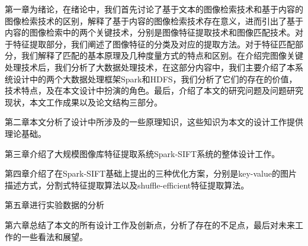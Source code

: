 第一章为绪论，在绪论中，我们首先讨论了基于文本的图像检索技术和基于内容的图像检索技术的区别，解释了基于内容的图像检索技术存在意义，进而引出了基于内容的图像检索中的两个关键技术，分别是图像特征提取技术和图像匹配技术。对于特征提取部分，我们阐述了图像特征的分类及对应的提取方法。对于特征匹配部分，我们解释了匹配的基本原理及几种度量方式的特点和区别。在介绍完图像关键处理技术后，我们分析了大数据处理技术，在这部分内容中，我们主要介绍了本系统设计中的两个大数据处理框架Spark和HDFS，我们分析了它们的存在的价值，技术特点，及在本文设计中扮演的角色。最后，介绍了本文的研究问题及问题研究现状，本文工作成果以及论文结构三部分。

第二章本文分析了设计中所涉及的一些原理知识，这些知识为本文的设计工作提供理论基础。

第三章介绍了大规模图像库特征提取系统Spark-SIFT系统的整体设计工作。

第四章介绍了在Spark-SIFT基础上提出的三种优化方案，分别是key-value的图片描述方式，分割式特征提取算法以及shuffle-efficient特征提取算法。

第五章进行实验数据的分析

第六章总结了本文的所有设计工作及创新点，分析了存在的不足点，最后对未来工作的一些看法和展望。


